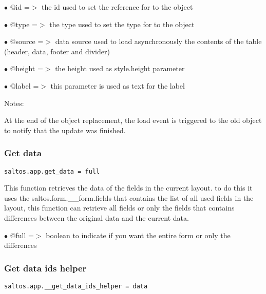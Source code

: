 \documentclass[a4paper]{article}
\begin{document}
\begin{compactitem}
\item[\color{myblue}$\bullet$] @id     =$>$ the id used to set the reference for to the object
\item[\color{myblue}$\bullet$] @type   =$>$ the type used to set the type for to the object
\item[\color{myblue}$\bullet$] @source =$>$ data source used to load asynchronously the contents of the table (header, data,
           footer and divider)
\item[\color{myblue}$\bullet$] @height =$>$ the height used as style.height parameter
\item[\color{myblue}$\bullet$] @label  =$>$ this parameter is used as text for the label
\end{compactitem}

Notes:

At the end of the object replacement, the load event is triggered to the old object to notify
that the update was finished.

\hypertarget{toc571}{}
\subsubsection{Get data}

\begin{lstlisting}
saltos.app.get_data = full
\end{lstlisting}

This function retrieves the data of the fields in the current layout. to do this it uses
the saltos.form.\_\_form.fields that contains the list of all used fields in the layout, this
function can retrieve all fields or only the fields that contains differences between the
original data and the current data.

\begin{compactitem}
\item[\color{myblue}$\bullet$] @full =$>$ boolean to indicate if you want the entire form or only the differences
\end{compactitem}

\hypertarget{toc572}{}
\subsubsection{Get data ids helper}

\begin{lstlisting}
saltos.app.__get_data_ids_helper = data
\end{lstlisting}
\end{document}
